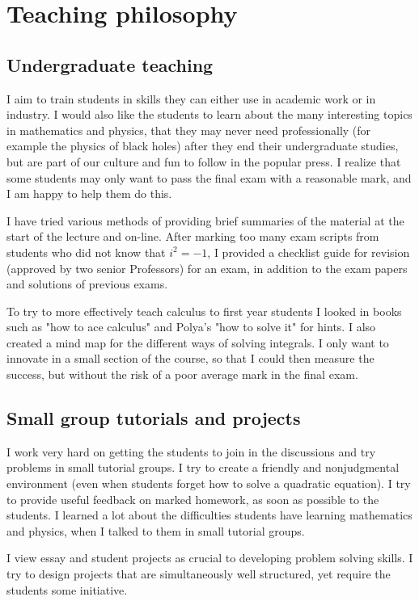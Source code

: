 \documentclass[12pt]{article}
\begin{document}
\section{Teaching philosophy} 

\subsection{Undergraduate teaching}

I aim to train students in skills they
can either use in academic work or in
industry. I would also like the students to
learn about the many interesting 
topics in mathematics and physics, that they may never 
need professionally (for example the physics of black holes)
after they end their undergraduate
studies, but are part of our culture and fun
to follow in the popular press.
I realize that some students may only want
to pass the final exam with a reasonable mark,
and I am happy to help them do this.

I have tried various methods of providing brief
summaries of the material at the start of the lecture
and on-line. After marking too many exam scripts from
students who did not know that $i^2 = -1$, I provided
a checklist guide for revision (approved by two senior
Professors) for an exam, 
in addition to the exam papers and solutions of previous exams.

To try to more effectively teach calculus to first year students I
looked in books such as "how to ace calculus" and Polya's "how to
solve it" for hints. I also created a mind map for the different ways
of solving integrals. I only want to innovate in a small section of
the course, so that I could then measure the success, but without the risk
of a poor average mark in the final exam.

\subsection{Small group tutorials and projects}


I work very hard on getting the students to join in the discussions
and try problems in small tutorial groups. I try to create
a friendly and nonjudgmental environment (even when
students forget how to solve a quadratic equation).
I try to provide useful feedback on marked homework,
as soon as possible to the students. I learned a lot
about the difficulties students have learning mathematics
and physics, when I talked to them in small tutorial
groups.

I view essay and student projects as crucial to developing
problem solving skills. I try to design projects
that are simultaneously well structured, yet require
the students some initiative.
\end{document}
